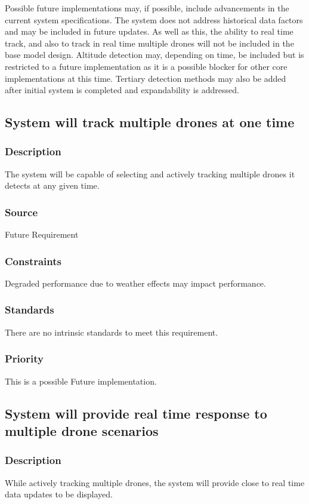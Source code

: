 Possible future implementations may, if possible, include advancements in the current system specifications. The system does not address historical data factors and may be included in future updates. As well as this, the ability to real time track, and also to track in real time multiple drones will not be included in the base model design. Altitude detection may, depending on time, be included but is restricted to a future implementation as it is a possible blocker for other core implementations at this time. Tertiary detection methods may also be added after initial system is completed and expandability is addressed.

\subsection{System will track multiple drones at one time}
\subsubsection{Description}
The system will be capable of selecting and actively tracking multiple drones it detects at any given time.
\subsubsection{Source}
Future Requirement
\subsubsection{Constraints}
Degraded performance due to weather effects may impact performance.
\subsubsection{Standards}
There are no intrinsic standards to meet this requirement.
\subsubsection{Priority}
This is a possible Future implementation.

\subsection{System will provide real time response to multiple drone scenarios}
\subsubsection{Description}
While actively tracking multiple drones, the system will provide close to real time data updates to be displayed.
